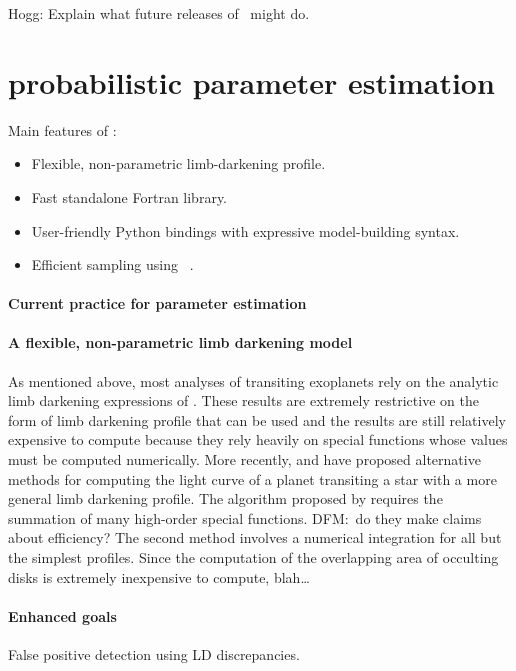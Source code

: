 \documentclass[letterpaper,12pt,preprint]{hack_aastex}
\newcommand{\Turnstile}{\package{IronHorse}}
\newcommand{\Bart}{\package{Bart}}
\newcommand{\emcee}{\package{emcee}}
\begin{document}
Hogg:  Explain what future releases of \Turnstile\ might do.


\section{probabilistic parameter estimation}

Main features of \Bart:
\begin{itemize}
\item Flexible, non-parametric limb-darkening profile.
\item Fast standalone Fortran library.
\item User-friendly Python bindings with expressive model-building syntax.
\item Efficient sampling using \emcee\ \citep{emcee}.
\end{itemize}

\paragraph{Current practice for parameter estimation}
\citet{mandel}

\paragraph{A flexible, non-parametric limb darkening model}
As mentioned above, most analyses of transiting exoplanets rely on the
analytic limb darkening expressions of \citet{mandel}.
These results are extremely restrictive on the form of limb darkening profile
that can be used and the results are still relatively expensive to compute
because they rely heavily on special functions whose values must be computed
numerically.
More recently, \citet{crazyass1} and \citet{crazyass2} have proposed
alternative methods for computing the light curve of a planet transiting a
star with a more general limb darkening profile.
The algorithm proposed by \citet{crazyass1} requires the summation of many
high-order special functions.
DFM:\ do they make claims about efficiency?
The second method \citep{crazyass2} involves a numerical integration for
all but the simplest profiles.
Since the computation of the overlapping area of occulting disks is extremely
inexpensive to compute, blah\ldots


\paragraph{Enhanced goals}
False positive detection using LD discrepancies.
\end{document}
